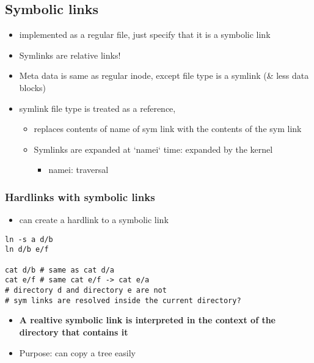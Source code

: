 \documentclass[11pt]{article}
\begin{document}
\subsection{Symbolic links}
\label{sec:orgd062b92}
\begin{itemize}
\item implemented as a regular file, just specify that it is a symbolic link
\item Symlinks are relative links!
\item Meta data is same as regular inode, except file type is a symlink (\& less data blocks)
\item symlink file type is treated as a reference,
\begin{itemize}
\item replaces contents of name of sym link with the contents of the sym link
\item Symlinks are expanded at `namei` time: expanded by the kernel
\begin{itemize}
\item namei: traversal
\end{itemize}
\end{itemize}
\end{itemize}
\subsubsection{Hardlinks with symbolic links}
\label{sec:orgf9a0a35}
\begin{itemize}
\item can create a hardlink to a symbolic link
\end{itemize}
\begin{verbatim}
ln -s a d/b
ln d/b e/f

cat d/b # same as cat d/a
cat e/f # same cat e/f -> cat e/a
# directory d and directory e are not
# sym links are resolved inside the current directory?
\end{verbatim}
\begin{itemize}
\item \textbf{\textbf{A realtive symbolic link is interpreted in the context of the directory that contains it}}
\item Purpose: can copy a tree easily
\end{itemize}
\end{document}
